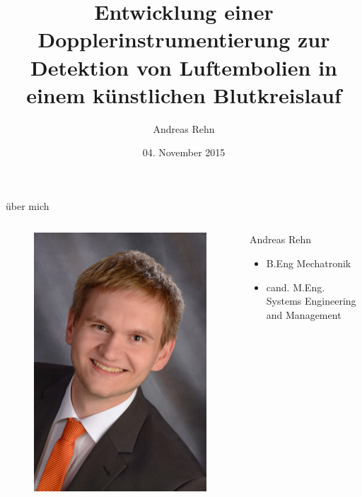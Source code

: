 \documentclass{beamer}
\newcommand{\fullname}{Andreas Rehn}
\newcommand{\titel}{Entwicklung einer Dopplerinstrumentierung zur Detektion von Luftembolien in einem künstlichen Blutkreislauf}
\begin{document}
\title{\titel}
\author[A. Rehn]{\fullname}
\date[04.11.15]{04. November 2015}

\frame{\titlepage}

\expandafter\def\expandafter\insertshorttitle\expandafter{%
  \insertshorttitle\hfill\insertframenumber}%

\begin{frame}{über mich}
	\begin{columns}
		\begin{figure}[h]
			\includegraphics[width=1\textwidth]{images/me}
		\end{figure}
		\begin{block}{Andreas Rehn}
		\begin{itemize}			
			\item B.Eng Mechatronik
			\item cand. M.Eng. Systems Engineering and Management
		\end{itemize}
		\end{block}
	\end{columns}


\end{frame}
\end{document}
